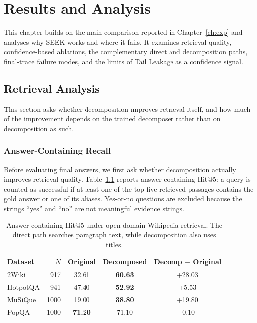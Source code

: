 \chapter{Results and Analysis}
\label{ch:results}

This chapter builds on the main comparison reported in Chapter~\ref{ch:exp} and analyses why SEEK works and where it fails. It examines retrieval quality, confidence-based ablations, the complementary direct and decomposition paths, final-trace failure modes, and the limits of Tail Leakage as a confidence signal.

\section{Retrieval Analysis}
\label{sec:retrieval-analysis}

This section asks whether decomposition improves retrieval itself, and how much of the improvement depends on the trained decomposer rather than on decomposition as such.

\subsection{Answer-Containing Recall}
\label{sec:retrieval-recall}

Before evaluating final answers, we first ask whether decomposition actually improves retrieval quality. Table~\ref{tab:answer-recall} reports answer-containing Hit@5: a query is counted as successful if at least one of the top five retrieved passages contains the gold answer or one of its aliases. Yes-or-no questions are excluded because the strings ``yes'' and ``no'' are not meaningful evidence strings.

\begin{table}[h]
    \centering
    \caption[Answer-Containing Retrieval Recall]{Answer-containing Hit@5 under open-domain Wikipedia retrieval. The direct path searches paragraph text, while decomposition also uses titles.}
    \label{tab:answer-recall}
    \setlength{\tabcolsep}{7pt}
    \small
    \begin{tabular}{ l r c c c }
        \toprule
        Dataset & $N$ & Original & Decomposed & Decomp $-$ Original \\
        \midrule
        2Wiki & 917 & 32.61 & \textbf{60.63} & +28.03 \\
        HotpotQA & 941 & 47.40 & \textbf{52.92} & +5.53 \\
        MuSiQue & 1000 & 19.00 & \textbf{38.80} & +19.80 \\
        PopQA & 1000 & \textbf{71.20} & 71.10 & -0.10 \\
        \bottomrule
    \end{tabular}
\end{table}

